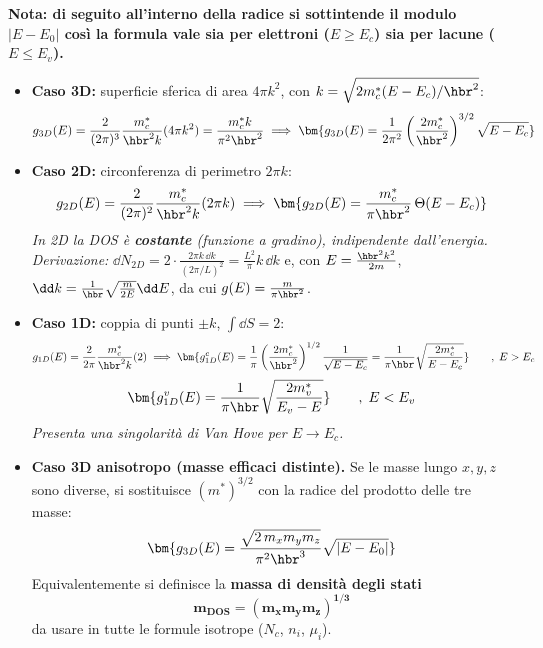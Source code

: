 \vspace{0.3cm}
\textbf{Nota: di seguito all'interno della radice si sottintende il modulo $|E-E_0|$ così la formula vale sia per elettroni ($E\ge E_c$) sia per lacune ($E\le E_v$).}

\begin{itemize}
    \item \textbf{Caso 3D:} superficie sferica di area $4\pi k^2$, con $k=\sqrt{2m_c^*(E-E_c)/\hbr^2}$:
\[ g_{3D}(E) = \frac{2}{(2\pi)^3}\frac{m_c^*}{\hbr^2k}(4\pi k^2) = \frac{m_c^*k}{\pi^2\hbr^2}
   \implies \bm{g_{3D}(E)=\frac{1}{2\pi^2}\left(\frac{2m_c^*}{\hbr^2}\right)^{3/2}\sqrt{E-E_c}} \]
\item \textbf{Caso 2D:} circonferenza di perimetro $2\pi k$:
\[ g_{2D}(E) = \frac{2}{(2\pi)^2}\frac{m_c^*}{\hbr^2k}(2\pi k) \implies \bm{g_{2D}(E)=\frac{m_c^*}{\pi\hbr^2}\,\Theta(E-E_c)} \]
\textit{In 2D la DOS è \textbf{costante} (funzione a gradino), indipendente dall'energia.}
\\ \textit{Derivazione:} $\dd N_{2D} = 2\cdot\frac{2\pi k\,\dd k}{(2\pi/L)^2} = \frac{L^2}{\pi}k\,\dd k$ e, con $E=\frac{\hbr^2k^2}{2m}$, $\dd k = \frac{1}{\hbr}\sqrt{\frac{m}{2E}}\dd E$, da cui $g(E)=\frac{m}{\pi\hbr^2}$.

\item \textbf{Caso 1D:} coppia di punti $\pm k$, $\int \dd S=2$:
\[ g_{1D}(E) = \frac{2}{2\pi}\frac{m_c^*}{\hbr^2k}(2) \implies \bm{g^c_{1D}(E)=\frac{1}{\pi}\left(\frac{2m_c^*}{\hbr^2}\right)^{1/2}\frac{1}{\sqrt{E-E_c}} = \frac{1}{\pi\hbr}\sqrt{\frac{2m_c^*}{E-E_c}}} \qquad, \; E>E_c \]
\[\bm{g^v_{1D}(E) = \frac{1}{\pi\hbr}\sqrt{\frac{2m_v^*}{E_v-E}}}  \qquad , \; E<E_v\]
\textit{Presenta una singolarità di Van Hove per $E\to E_c$.}

\item \textbf{Caso 3D anisotropo (masse efficaci distinte).} Se le masse lungo $x,y,z$ sono diverse, si sostituisce $(m^*)^{3/2}$ con la radice del prodotto delle tre masse:
\[ \bm{g_{3D}(E)=\frac{\sqrt{2\,m_xm_ym_z}}{\pi^2\hbr^3}\sqrt{|E-E_0|}} \]
Equivalentemente si definisce la \textbf{massa di densità degli stati}
\[ \bm{m_{DOS} = (m_xm_ym_z)^{1/3}} \]
da usare in tutte le formule isotrope ($N_c$, $n_i$, $\mu_i$).
\end{itemize}

